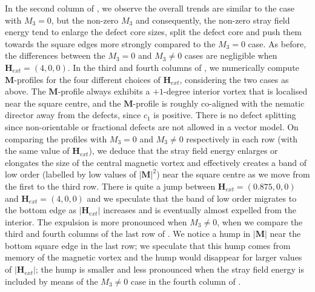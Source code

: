 \documentclass{article}
\def \Mvec{\mathbf{M}}
\def\Hvec{\mathbf{H}}
\begin{document}
In the second column of , we observe the overall trends are similar to the case with $M_3=0$, but the non-zero $M_3$ and consequently, the non-zero stray field energy tend to enlarge the defect core sizes, split the defect core and push them towards the square edges more strongly compared to the $M_3=0$ case. As before, the differences between the $M_3=0$ and $M_3 \neq 0$ cases are negligible when $\Hvec_{ext} = (4,0,0)$. 
In the third and fourth columns of , we numerically compute $\Mvec$-profiles for the four different choices of $\Hvec_{ext}$, considering the two cases as above. The $\Mvec$-profile always exhibits a $+1$-degree interior vortex that is localised near the square centre, and the $\Mvec$-profile is roughly co-aligned with the nematic director away from the defects, since $c_1$ is positive. There is no defect splitting since non-orientable or fractional defects are not allowed in a vector model.  
On comparing the profiles with $M_3=0$ and $M_3 \neq 0$ respectively in each row (with the same value of $\Hvec_{ext}$), we deduce that the stray field energy enlarges or elongates the size of the central magnetic vortex and effectively creates a band of low order (labelled by low values of $|\Mvec|^2$) near the square centre as we move from the first to the third row. There is quite a jump between $\Hvec_{ext}=(0.875, 0,0)$ and $\Hvec_{ext}=(4,0,0)$ and we speculate that the band of low order migrates to the bottom edge as $|\Hvec_{ext}|$ increases and is eventually almost expelled from the interior. The expulsion is more pronounced when $M_3 \neq 0$, when we compare the third and fourth columns of the last row of . We notice a hump in $|\Mvec|$ near the bottom square edge in the last row; we speculate that this hump comes from memory of the magnetic vortex and the hump would disappear for larger values of $|\Hvec_{ext}|$; the hump is smaller and less pronounced when the stray field energy is included by means of the $M_3 \neq 0$ case in the fourth column of .  
\end{document}
